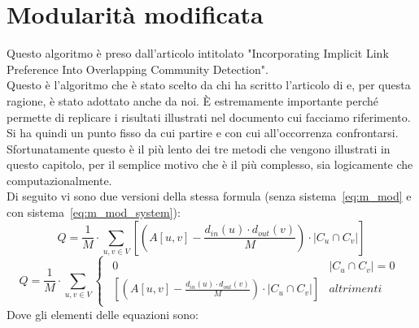 \section{Modularità modificata}
Questo algoritmo\cite{M-mod_code} è preso dall'articolo intitolato "Incorporating Implicit Link Preference Into Overlapping Community Detection"\cite{M-mod_paper}.\\
Questo è l'algoritmo che è stato scelto da chi ha scritto l'articolo di \cnrl e, per questa ragione, è stato adottato anche da noi. È estremamente importante perché permette di replicare i risultati illustrati nel documento cui facciamo riferimento. Si ha quindi un punto fisso da cui partire e con cui all'occorrenza confrontarsi.\\
Sfortunatamente questo è il più lento dei tre metodi che vengono illustrati in questo capitolo, per il semplice motivo che è il più complesso, sia logicamente che computazionalmente.\\
Di seguito vi sono due versioni della stessa formula (senza sistema~\ref{eq:m_mod} e con sistema~\ref{eq:m_mod_system}):
\begin{equation}
	Q = \frac{1}{M} \cdot \sum_{u,v \in V}
		\left[
			\left( A \left[ u,v \right] - \frac{ d_{in}\left(u\right) \cdot d_{out}\left(v\right) }{M} \right)
			\cdot
			|C_u \cap C_v| 
		\right]
	\label{eq:m_mod}
\end{equation}
%
\begin{equation}
	Q = \frac{1}{M} \cdot \sum_{u,v \in V}
		\begin{cases}
			\begin{array}{ll}
				0 & |C_u \cap C_v| = 0 \\
				\left[ \left( A \left[ u,v \right] - \frac{ d_{in}\left(u\right) \cdot d_{out}\left(v\right) }{M} \right) \cdot |C_u \cap C_v| \right]
				& altrimenti
			\end{array}
		\end{cases}
	\label{eq:m_mod_system}
\end{equation}
Dove gli elementi delle equazioni sono:
